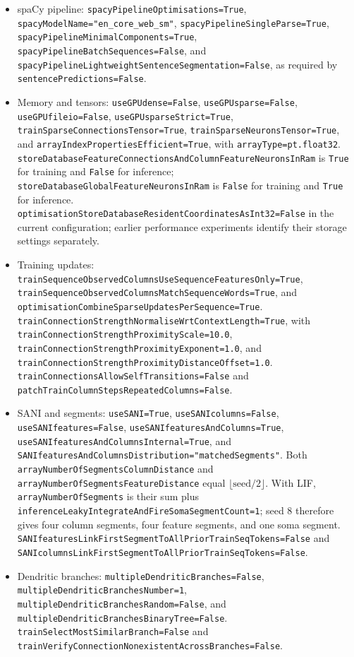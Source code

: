 \begin{itemize}
	\item spaCy pipeline: \texttt{spacyPipelineOptimisations=True}, \texttt{spacyModelName="en_core_web_sm"}, \texttt{spacyPipelineSingleParse=True}, \texttt{spacyPipelineMinimalComponents=True}, \texttt{spacyPipelineBatchSequences=False}, and \texttt{spacyPipelineLightweightSentenceSegmentation=False}, as required by \texttt{sentencePredictions=False}.
	\item Memory and tensors: \texttt{useGPUdense=False}, \texttt{useGPUsparse=False}, \texttt{useGPUfileio=False}, \texttt{useGPUsparseStrict=True}, \texttt{trainSparseConnectionsTensor=True}, \texttt{trainSparseNeuronsTensor=True}, and \texttt{arrayIndexPropertiesEfficient=True}, with \texttt{arrayType=pt.float32}. \texttt{storeDatabaseFeatureConnectionsAndColumnFeatureNeuronsInRam} is \texttt{True} for training and \texttt{False} for inference; \texttt{storeDatabaseGlobalFeatureNeuronsInRam} is \texttt{False} for training and \texttt{True} for inference. \texttt{optimisationStoreDatabaseResidentCoordinatesAsInt32=False} in the current configuration; earlier performance experiments identify their storage settings separately.
	\item Training updates: \texttt{trainSequenceObservedColumnsUseSequenceFeaturesOnly=True}, \texttt{trainSequenceObservedColumnsMatchSequenceWords=True}, and \texttt{optimisationCombineSparseUpdatesPerSequence=True}. \texttt{trainConnectionStrengthNormaliseWrtContextLength=True}, with \texttt{trainConnectionStrengthProximityScale=10.0}, \texttt{trainConnectionStrengthProximityExponent=1.0}, and \texttt{trainConnectionStrengthProximityDistanceOffset=1.0}. \texttt{trainConnectionsAllowSelfTransitions=False} and \texttt{patchTrainColumnStepsRepeatedColumns=False}.
	\item SANI and segments: \texttt{useSANI=True}, \texttt{useSANIcolumns=False}, \texttt{useSANIfeatures=False}, \texttt{useSANIfeaturesAndColumns=True}, \texttt{useSANIfeaturesAndColumnsInternal=True}, and \texttt{SANIfeaturesAndColumnsDistribution="matchedSegments"}. Both \texttt{arrayNumberOfSegmentsColumnDistance} and \texttt{arrayNumberOfSegmentsFeatureDistance} equal $\lfloor\text{seed}/2\rfloor$. With LIF, \texttt{arrayNumberOfSegments} is their sum plus \texttt{inferenceLeakyIntegrateAndFireSomaSegmentCount=1}; seed 8 therefore gives four column segments, four feature segments, and one soma segment. \texttt{SANIfeaturesLinkFirstSegmentToAllPriorTrainSeqTokens=False} and \texttt{SANIcolumnsLinkFirstSegmentToAllPriorTrainSeqTokens=False}.
	\item Dendritic branches: \texttt{multipleDendriticBranches=False}, \texttt{multipleDendriticBranchesNumber=1}, \texttt{multipleDendriticBranchesRandom=False}, and \texttt{multipleDendriticBranchesBinaryTree=False}. \texttt{trainSelectMostSimilarBranch=False} and \texttt{trainVerifyConnectionNonexistentAcrossBranches=False}.

\end{itemize}
